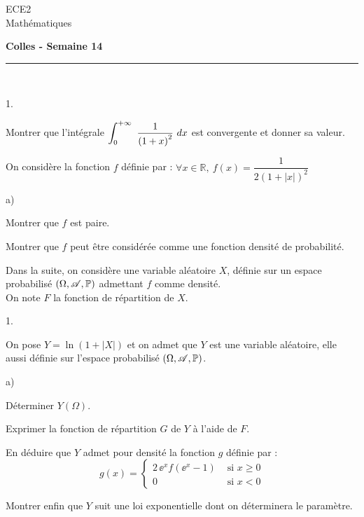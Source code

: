 \documentclass[11pt]{article}%
\begin{document}
\begin{flushleft}
ECE2 \\
Mathématiques
\end{flushleft}

\begin{center}
\textbf{\Large{Colles - Semaine 14}}
\end{center}

\hrule

\vspace*{0,2cm}

\begin{exercice}~
  \begin{noliste}{1.}
  \item Montrer que l'intégrale $ \displaystyle \int_{0}^{+\infty }\ \dfrac{1}{\left(
        1+x\right) ^{2}} \ dx$ est convergente et donner sa valeur.
  \item On considère la fonction $f$ définie par : $\forall x\in
    \mathbb{R},\ f\left( x\right) =\dfrac{1}{2\left( 1+\left \vert
          x\right \vert \right) ^{2}}$
    \begin{noliste}{a)}
    \item Montrer que $f$ est paire.
    \item Montrer que $f$ peut être considérée comme une fonction
      densité de probabilité.
    \end{noliste}
  \end{noliste}
  Dans la suite, on considère une variable aléatoire $X$, définie sur
  un espace probabilisé $\left( \Omega , \mathscr{A}, \mathbb{P} \right) $ 
admettant
  $f$ comme densité.\\
  On note $F$ la fonction de répartition de $X$.
  \begin{noliste}{1.}
    \addtocounter{enumi}{+2}
  \item On pose $Y=\ln \left( 1+\left \vert X\right \vert \right) $ et
    on admet que $Y$ est une variable aléatoire, elle aussi définie
    sur l'espace probabilisé $\left( \Omega , \mathscr{A}, \mathbb{P} \right)$.
    \begin{noliste}{a)}
    \item Déterminer $Y\left( \Omega \right) $.
    \item Exprimer la fonction de répartition $G$ de $Y$ à l'aide de
      $F.$
    \item En déduire que $Y$ admet pour densité la fonction $g$
      définie par : 
      \[ 
      g(x) = %
      \left\{
        \begin{array}{cl}
          2 \, \ee^{x}f\left( \ee^{x}-1\right) & \mbox{ si $x \geq 0$} 
	  \\
          0 & \mbox{ si $x<0$} %
        \end{array}
      \right.
      \]
    \item Montrer enfin que $Y$ suit une loi exponentielle dont on
      déterminera le paramètre.
    \end{noliste}
  \end{noliste}
\end{exercice}
\end{document}
